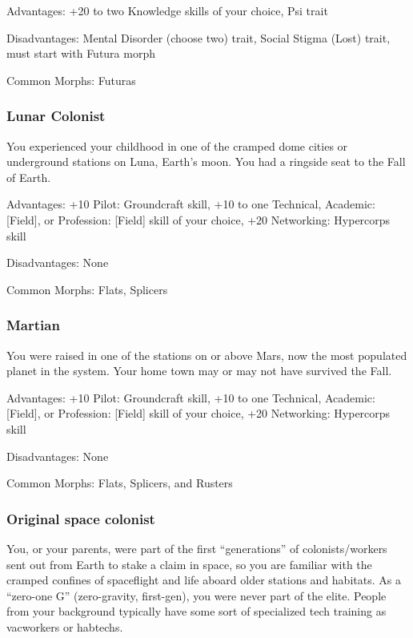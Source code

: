 Advantages: +20 to two Knowledge skills of your choice, Psi trait 

Disadvantages: Mental Disorder (choose two) trait, Social Stigma (Lost) trait, must start with Futura morph 

Common Morphs: Futuras 

\subsubsection{Lunar Colonist} \label{sec:lunar-colonist} 

You experienced your childhood in one of the cramped dome cities or underground stations on Luna, Earth’s moon. You had a ringside seat to the Fall of Earth. 

Advantages: +10 Pilot: Groundcraft skill, +10 to one Technical, Academic: [Field], or Profession: [Field] skill of your choice, +20 Networking: Hypercorps skill 

Disadvantages: None 

Common Morphs: Flats, Splicers 





\subsubsection{Martian} \label{sec:martian} 

You were raised in one of the stations on or above Mars, now the most populated planet in the system. Your home town may or may not have survived the Fall. 

Advantages: +10 Pilot: Groundcraft skill, +10 to one Technical, Academic: [Field], or Profession: [Field] skill of your choice, +20 Networking: Hypercorps skill 

Disadvantages: None 

Common Morphs: Flats, Splicers, and Rusters 

\subsubsection{Original space colonist} \label{sec:original-space-colonist} 

You, or your parents, were part of the first “generations” of colonists/workers sent out from Earth to stake a claim in space, so you are familiar with the cramped confines of spaceflight and life aboard older stations and habitats. As a “zero-one G” (zero-gravity, first-gen), you were never part of the elite. People from your background typically have some sort of specialized tech training as vacworkers or habtechs. 

